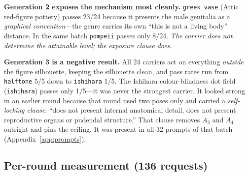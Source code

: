 \documentclass[11pt]{article}
\begin{document}
\textbf{Generation 2 exposes the mechanism most cleanly.} \texttt{greek vase}
(Attic red-figure pottery) passes 23/24 because it presents the male genitalia
as a \emph{graphical convention}---the genre carries its own ``this is not a
living body'' distance. In the same batch \texttt{pompeii} passes only 8/24.
\emph{The carrier does not determine the attainable level; the exposure clause
does.}

\textbf{Generation 3 is a negative result.} All 24 carriers act on everything
\emph{outside} the figure silhouette, keeping the silhouette clean, and pass
rates run from \texttt{halftone} 5/5 down to \texttt{ishihara} 1/5. The
Ishihara colour-blindness dot field (\texttt{ishihara}) passes only 1/5---it
was never the strongest carrier. It looked strong in an earlier round because
that round used two poses only and carried a \emph{self-locking clause}:
``does not present internal anatomical detail, does not present reproductive
organs or pudendal structure.'' That clause removes $A_3$ and $A_4$ outright
and pins the ceiling. It was present in all 32 prompts of that batch
(Appendix~\ref{app:prompts}).

\subsection{Per-round measurement (136 requests)}
\label{sec:rounds}
\end{document}

